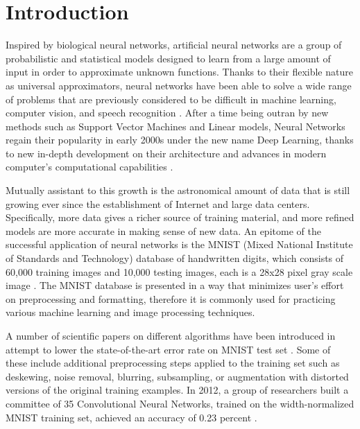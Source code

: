 \documentclass[conference]{IEEEtran}
\begin{document}
\IEEEpeerreviewmaketitle

\section{Introduction}
\label{sec:introduction}
Inspired by biological neural networks, artificial neural networks are a group of probabilistic and statistical models designed to learn from a large amount of input in order to approximate unknown functions. Thanks to their flexible nature as universal approximators, neural networks have been able to solve a wide range of problems that are previously considered to be difficult in machine learning, computer vision, and speech recognition \cite{NovelConnectionist,Kurzweilinterview}. After a time being outran by new methods such as Support Vector Machines and Linear models, Neural Networks regain their popularity in early 2000s under the new name Deep Learning, thanks to new in-depth development on their architecture and advances in modern computer's computational capabilities \cite{NIPS2008_3449,Rumelhart:ExploMicroStructure}.

Mutually assistant to this growth is the astronomical amount of data that is still growing ever since the establishment of Internet and large data centers\cite{website:dataeverywhere}. Specifically, more data gives a richer source of training material, and more refined models are more accurate in making sense of new data. An epitome of the successful application of neural networks is the MNIST (Mixed National Institute of Standards and Technology) database of handwritten digits, which consists of 60,000 training images and 10,000 testing images, each is a 28x28 pixel gray scale image \cite{Kussul_improvedmethod}. The MNIST database is presented in a way that minimizes user's effort on preprocessing and formatting, therefore it is commonly used for practicing various machine learning and image processing techniques\cite{SVMSpeedPatternReg,usinganalytic}.

A number of scientific papers on different algorithms have been introduced in attempt to lower the state-of-the-art error rate on MNIST test set \cite{FastKNNClusterBasedTrees,MNISTHandWritten}. Some of these include additional preprocessing steps applied to the training set such as deskewing, noise removal, blurring, subsampling, or augmentation with distorted versions of the original training examples\cite{Lecun98gradient-basedlearning}. In 2012, a group of researchers built a committee of 35 Convolutional Neural Networks, trained on the width-normalized MNIST training set, achieved an accuracy of 0.23 percent \cite{MultiColummn}.
\end{document}
